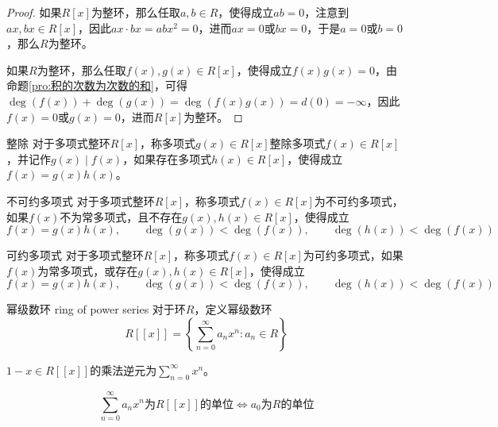 \begin{proof}
	如果$R[x]$为整环，那么任取$a,b\in R$，使得成立$ab=0$，注意到$ax,bx\in R[x]$，因此$ax\cdot bx=abx^2=0$，进而$ax=0$或$bx=0$，于是$a=0$或$b=0$，那么$R$为整环。
	
	如果$R$为整环，那么任取$f(x),g(x)\in R[x]$，使得成立$f(x)g(x)=0$，由命题\ref{pro:积的次数为次数的和}，可得$\deg(f(x))+\deg(g(x))=\deg(f(x)g(x))=d(0)=-\infty$，因此$f(x)=0$或$g(x)=0$，进而$R[x]$为整环。
\end{proof}

\begin{definition}{整除}
	对于多项式整环$R[x]$，称多项式$g(x)\in R[x]$整除多项式$f(x)\in R[x]$，并记作$g(x)\mid f(x)$，如果存在多项式$h(x)\in R[x]$，使得成立$f(x)=g(x)h(x)$。
\end{definition}

\begin{definition}{不可约多项式}
	对于多项式整环$R[x]$，称多项式$f(x)\in R[x]$为不可约多项式，如果$f(x)$不为常多项式，且不存在$g(x),h(x)\in R[x]$，使得成立
	$$
	f(x)=g(x)h(x),\qquad 
	\deg(g(x))<\deg(f(x)),\qquad 
	\deg(h(x))<\deg(f(x))
	$$
\end{definition}

\begin{definition}{可约多项式}
	对于多项式整环$R[x]$，称多项式$f(x)\in R[x]$为可约多项式，如果$f(x)$为常多项式，或存在$g(x),h(x)\in R[x]$，使得成立
	$$
	f(x)=g(x)h(x),\qquad 
	\deg(g(x))<\deg(f(x)),\qquad 
	\deg(h(x))<\deg(f(x))
	$$
\end{definition}

\begin{definition}{幂级数环 ring of power series}
	对于环$R$，定义幂级数环
	$$
	R[[x]]=\left\{ \sum_{n=0}^{\infty}a_nx^n:a_n\in R \right\}
	$$
\end{definition}

\begin{example}
	$1-x\in R[[x]]$的乘法逆元为$\displaystyle \sum_{n=0}^{\infty}{x^n}$。
\end{example}

\begin{proposition}
	$$
	\sum_{n=0}^{\infty}a_n x^n\text{为}R[[x]]\text{的单位}\iff a_0\text{为}R\text{的单位}
	$$
\end{proposition}

